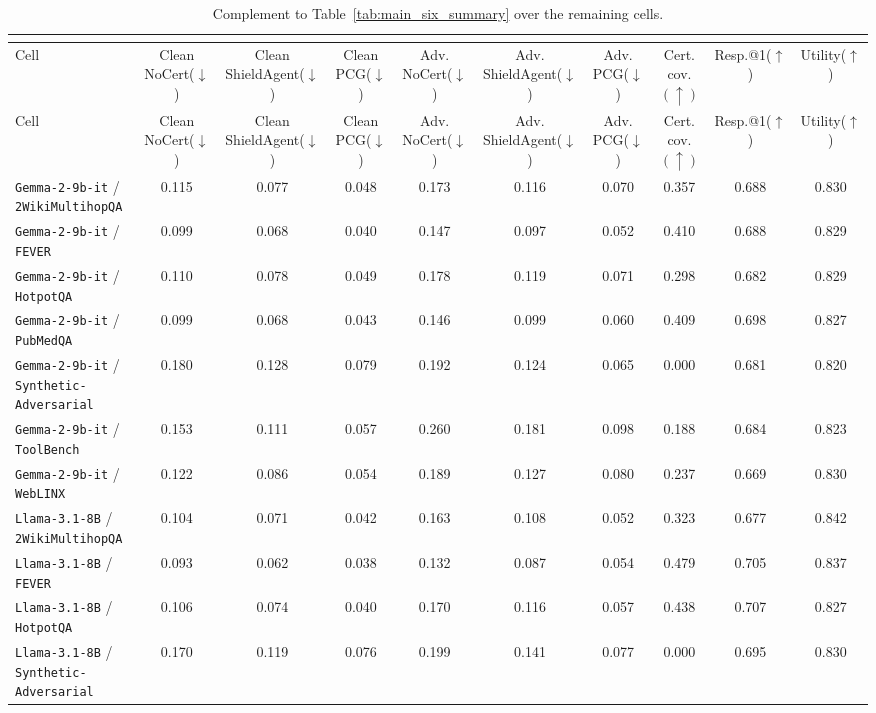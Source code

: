 \begin{longtable}{lccccccccc}
\caption{\small Complement to Table~\ref{tab:main_six_summary} over the remaining cells.}\\
\label{tab:appendix_remaining_50_summary}\\
\toprule
Cell & Clean NoCert($\downarrow$) & Clean ShieldAgent($\downarrow$) & Clean PCG($\downarrow$) & Adv. NoCert($\downarrow$) & Adv. ShieldAgent($\downarrow$) & Adv. PCG($\downarrow$) & Cert. cov.$(\uparrow)$ & Resp.@1($\uparrow$) & Utility($\uparrow$) \\
\midrule
\endfirsthead
\toprule
Cell & Clean NoCert($\downarrow$) & Clean ShieldAgent($\downarrow$) & Clean PCG($\downarrow$) & Adv. NoCert($\downarrow$) & Adv. ShieldAgent($\downarrow$) & Adv. PCG($\downarrow$) & Cert. cov.$(\uparrow)$ & Resp.@1($\uparrow$) & Utility($\uparrow$) \\
\midrule
\endhead
\texttt{Gemma-2-9b-it} / \texttt{2WikiMultihopQA} & 0.115 & 0.077 & 0.048 & 0.173 & 0.116 & 0.070 & 0.357 & 0.688 & 0.830 \\
\texttt{Gemma-2-9b-it} / \texttt{FEVER} & 0.099 & 0.068 & 0.040 & 0.147 & 0.097 & 0.052 & 0.410 & 0.688 & 0.829 \\
\texttt{Gemma-2-9b-it} / \texttt{HotpotQA} & 0.110 & 0.078 & 0.049 & 0.178 & 0.119 & 0.071 & 0.298 & 0.682 & 0.829 \\
\texttt{Gemma-2-9b-it} / \texttt{PubMedQA} & 0.099 & 0.068 & 0.043 & 0.146 & 0.099 & 0.060 & 0.409 & 0.698 & 0.827 \\
\texttt{Gemma-2-9b-it} / \texttt{Synthetic-Adversarial} & 0.180 & 0.128 & 0.079 & 0.192 & 0.124 & 0.065 & 0.000 & 0.681 & 0.820 \\
\texttt{Gemma-2-9b-it} / \texttt{ToolBench} & 0.153 & 0.111 & 0.057 & 0.260 & 0.181 & 0.098 & 0.188 & 0.684 & 0.823 \\
\texttt{Gemma-2-9b-it} / \texttt{WebLINX} & 0.122 & 0.086 & 0.054 & 0.189 & 0.127 & 0.080 & 0.237 & 0.669 & 0.830 \\
\texttt{Llama-3.1-8B} / \texttt{2WikiMultihopQA} & 0.104 & 0.071 & 0.042 & 0.163 & 0.108 & 0.052 & 0.323 & 0.677 & 0.842 \\
\texttt{Llama-3.1-8B} / \texttt{FEVER} & 0.093 & 0.062 & 0.038 & 0.132 & 0.087 & 0.054 & 0.479 & 0.705 & 0.837 \\
\texttt{Llama-3.1-8B} / \texttt{HotpotQA} & 0.106 & 0.074 & 0.040 & 0.170 & 0.116 & 0.057 & 0.438 & 0.707 & 0.827 \\
\texttt{Llama-3.1-8B} / \texttt{Synthetic-Adversarial} & 0.170 & 0.119 & 0.076 & 0.199 & 0.141 & 0.077 & 0.000 & 0.695 & 0.830 \\

\end{longtable}
